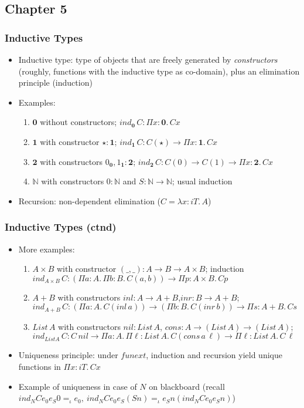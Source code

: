 \documentclass[handout]{beamer}
\newcommand{\depi}[3]{\Pi{#1{:}#2.\,#3}}
\newcommand{\lamt}[3]{\lambda{#1{:}#2.\,#3}}
\newcommand{\Nat}{\mathbb{N}}
\newcommand{\bfnull}{\mathbf{0}}
\newcommand{\bfone}{\mathbf{1}}
\newcommand{\bftwo}{\mathbf{2}}
\begin{document}
  \subsection{Chapter 5}

\frame
  {
    \frametitle{Inductive Types}

    \begin{itemize}[<+->]
    \item Inductive type: type of objects that are freely generated by \emph{constructors} 
    (roughly, functions with the inductive type as co-domain), plus an elimination principle (induction)
    \item Examples:
      \begin{enumerate}[<+->]
      \item $\bfnull$ without constructors; $ind_{\bfnull}\,C : \depi{x}{\bfnull}{Cx}$
      \item $\bfone$ with constructor $\star: \bfone$; $ind_{\bfone}\,C : C(\star) \to \depi{x}{\bfone}{Cx}$
      \item $\bftwo$ with constructors $0_\bfnull,1_\bfone : \bftwo$; 
                $ind_{\bftwo}\,C : C(0){\to}C(1){\to}\depi{x}{\bftwo}{Cx}$ 
      \item $\Nat$ with constructors $0:\Nat$ and $S : \Nat\to\Nat$; usual induction
      \end{enumerate}
      \item Recursion: non-dependent elimination ($C=\lamt{x}{{i}\!\!T}{A}$)    
    \end{itemize}
  }

\frame
  {
    \frametitle{Inductive Types (ctnd)}

    \begin{itemize}[<+->]
      \item More examples:
      \begin{enumerate}[<+->]
        \item $A\times B$ with constructor $(\_,\_):A\to B\to {A}\times{B}$; induction
        $ind_{A\times B}\,C : (\depi{a}{A}{\depi{b}{B}{C(a,b)}}) \to \depi{p}{A{\times}B}{Cp}$ 
        \item ${A}+{B}$ with constructors $inl: A \to {A}+{B}$,$inr: B\to {A}+{B}$;\\
        $ind_{A+B}\,C : (\depi{a}{A}{C(inl\,a)}){\to}(\depi{b}{B}{C(inr\,b)}){\to}\depi{s}{A{+}B}{Cs} $
        \item $List\,A$ with constructors $nil{:}List\,A$, $cons{:}A{\to}(List\,A){\to}(List\,A)$;
        $ind_{List A}\,C{:}C\,nil \to \depi{a}{A}{\depi{\ell}{List\,A}{C(cons\,a\,\ell)}}{\to}\depi{\ell}{List\,A}{C\,\ell}$ 
      \end{enumerate}
      \item Uniqueness principle: under $funext$, induction and recursion yield
      unique functions in $\depi{x}{{i}\!\!T}{Cx}$
      \item Example of uniqueness in case of $N$ on blackboard (recall
        $ind_N C e_0 e_S 0 =_\iota e_0, ~ind_N C e_0 e_S (S n) =_\iota e_S n (ind_N C e_0 e_S n)$)   
    \end{itemize}
  }
\end{document}
